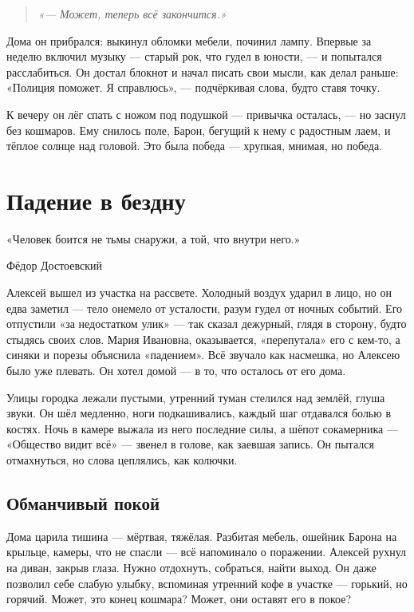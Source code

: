 \documentclass[12pt,a4paper]{book}
\newenvironment{innerthought}{\begin{quote}\small\itshape}{\end{quote}}
\begin{document}
\begin{innerthought}
«— Может, теперь всё закончится.»
\end{innerthought}

Дома он прибрался: выкинул обломки мебели, починил лампу. Впервые за неделю включил музыку — старый рок, что гудел в юности, — и попытался расслабиться. Он достал блокнот и начал писать свои мысли, как делал раньше: «Полиция поможет. Я справлюсь», — подчёркивая слова, будто ставя точку.

К вечеру он лёг спать с ножом под подушкой — привычка осталась, — но заснул без кошмаров. Ему снилось поле, Барон, бегущий к нему с радостным лаем, и тёплое солнце над головой. Это была победа — хрупкая, мнимая, но победа.

\chapter{Падение в бездну}
\epigraph{«Человек боится не тьмы снаружи, а той, что внутри него.»}{Фёдор Достоевский}

Алексей вышел из участка на рассвете. Холодный воздух ударил в лицо, но он едва заметил — тело онемело от усталости, разум гудел от ночных событий. Его отпустили «за недостатком улик» — так сказал дежурный, глядя в сторону, будто стыдясь своих слов. Мария Ивановна, оказывается, «перепутала» его с кем-то, а синяки и порезы объяснила «падением». Всё звучало как насмешка, но Алексею было уже плевать. Он хотел домой — в то, что осталось от его дома.

Улицы городка лежали пустыми, утренний туман стелился над землёй, глуша звуки. Он шёл медленно, ноги подкашивались, каждый шаг отдавался болью в костях. Ночь в камере выжала из него последние силы, а шёпот сокамерника — «Общество видит всё» — звенел в голове, как заевшая запись. Он пытался отмахнуться, но слова цеплялись, как колючки.

\section{Обманчивый покой}

Дома царила тишина — мёртвая, тяжёлая. Разбитая мебель, ошейник Барона на крыльце, камеры, что не спасли — всё напоминало о поражении. Алексей рухнул на диван, закрыв глаза. Нужно отдохнуть, собраться, найти выход. Он даже позволил себе слабую улыбку, вспоминая утренний кофе в участке — горький, но горячий. Может, это конец кошмара? Может, они оставят его в покое?
\end{document}
